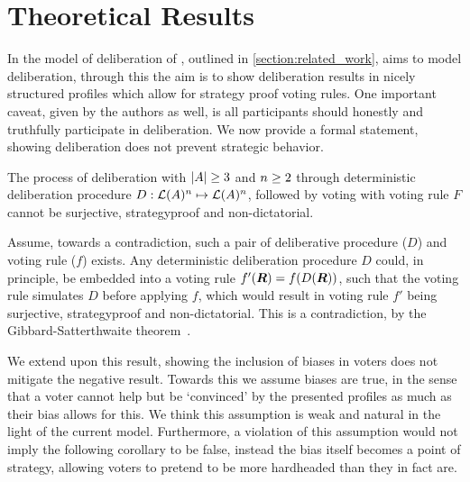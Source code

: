 \newpage
\chapter{Theoretical Results}
\label{theory}


In the model of deliberation of \citet{radDeliberationSinglePeakednessCoherent2021a}, outlined in \cref{section:related_work}, aims to model deliberation, through this the aim is to show deliberation results in nicely structured profiles which allow for strategy proof voting rules. One important caveat, given by the authors as well, is all participants should honestly and truthfully participate in deliberation. We now provide a formal statement, showing deliberation does not prevent strategic behavior.

\begin{proposition}
	The process of deliberation with $|A| \geq 3$ and \(n \geq 2\) through deterministic deliberation procedure \({D}: \mathcal{L}(A)^n \mapsto \mathcal{L}(A)^n\), followed by voting with voting rule $F$ cannot be surjective, strategyproof and non-dictatorial.

	\label{proposition:deterministic-delib}
\end{proposition}

\begin{proofc}
	Assume, towards a contradiction, such a pair of deliberative procedure ($D$) and voting rule (\(f\)) exists. Any deterministic deliberation procedure $D$ could, in principle, be embedded into a voting rule $f'(\boldsymbol{R}) = f(D(\boldsymbol{R}))$, such that the voting rule simulates $D$ before applying $f$, which would result in  voting rule $f'$ being surjective, strategyproof and non-dictatorial. This is a contradiction, by the Gibbard-Satterthwaite theorem~\citep{gibbardManipulationVotingSchemes1973,satterthwaiteStrategyproofnessArrowsConditions1975}.
\end{proofc}


We extend upon this result, showing the inclusion of biases in voters does not mitigate the negative result. Towards this we assume biases are true, in the sense that a voter cannot help but be `convinced' by the presented profiles as much as their bias allows for this. We think this assumption is weak and natural in the light of the current model. Furthermore, a violation of this assumption would not imply the following corollary to be false, instead the bias itself becomes a point of strategy, allowing voters to pretend to be more hardheaded than they in fact are.

